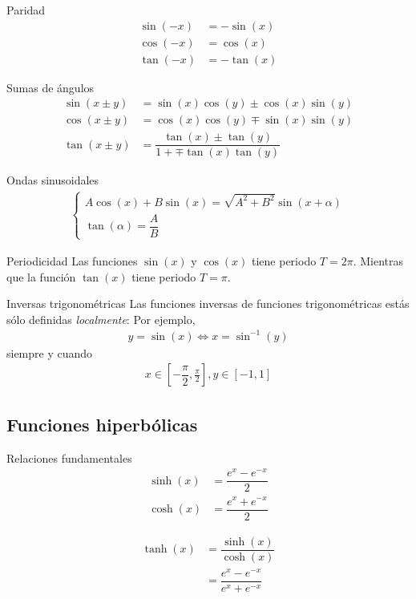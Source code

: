 {Paridad}
     \begin{align}
   \sin(-x) &= -\sin(x) \\ 
   \cos(-x) &= \cos(x) \\ 
   \tan(-x) &= -\tan(x) 
   \end{align}

{Sumas de ángulos}
     \begin{align}
   \sin(x\pm y) &= \sin(x)\cos(y)\pm\cos(x)\sin(y) \\   
   \cos(x\pm y) &= \cos(x)\cos(y)\mp\sin(x)\sin(y) \\   
   \tan(x\pm y) &= \dfrac{\tan(x)\pm \tan(y)}{1+\mp \tan(x)\tan(y)}
   \end{align}

{Ondas sinusoidales}
     \begin{align}
   \begin{cases}
A\cos(x)+B\sin(x) = \sqrt{A^{2}+B^{2}}\sin(x+\alpha)\\
\tan(\alpha) = \dfrac{A}{B}
\end{cases}
   \end{align}

{Periodicidad}
  Las funciones $\sin(x)$ y $\cos(x)$ tiene periodo $T=2\pi$.   
  Mientras que la función $\tan(x)$ tiene periodo $T=\pi$.
  
  
{Inversas trigonométricas}
   Las funciones inversas de funciones trigonométricas estás sólo definidas \emph{localmente}:  Por ejemplo,
      \begin{align}
     y = \sin(x) \iff x =\sin^{-1}(y)
     \end{align} 
     siempre y cuando 
          \begin{align}
      x\in\left[-\dfrac{\pi}{2}, \frac{\pi}{2} \right],
      y\in\left[ -1,1 \right]
      \end{align}

\subsection{Funciones hiperbólicas}
{Relaciones fundamentales}
 \begin{align}
\sinh(x) &= \dfrac{e^{x}-e^{-x}}{2}\\ 
\cosh(x) &= \dfrac{e^{x}+e^{-x}}{2}
\end{align}

{}
\begin{align}
\tanh(x) &= \dfrac{\sinh(x)}{\cosh(x)}\\ 
&=\dfrac{e^{x}-e^{-x}}{e^{x}+e^{-x}}
 \end{align}  

